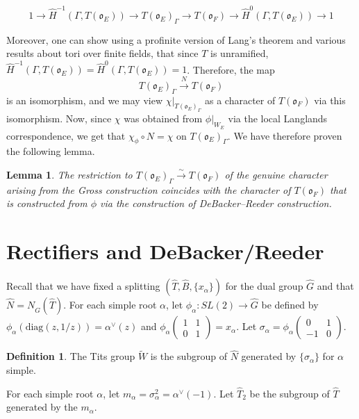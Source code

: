 \documentclass[11pt]{amsart}
\theoremstyle{plain}
\newtheorem{lemma}[theorem]{Lemma}
\theoremstyle{definition}
\newtheorem{definition}[theorem]{Definition}
\newcommand{\mat}[4]{\left( \begin{array}{cc} {#1} & {#2} \\ {#3} & {#4}
\end{array} \right)}
\begin{document}
$$1 \rightarrow \hat{H}^{-1}(\Gamma, T(\mathfrak{o}_E)) \rightarrow T(\mathfrak{o}_E)_{\Gamma}
  \rightarrow T(\mathfrak{o}_F) \rightarrow \hat{H}^0(\Gamma, T(\mathfrak{o}_E)) \rightarrow 1$$

Moreover, one can show using a profinite version of Lang's theorem and
various results about tori over finite fields, that since $T$ is unramified,
$\hat{H}^{-1}(\Gamma, T(\mathfrak{o}_E)) = \hat{H}^0(\Gamma, T(\mathfrak{o}_E)) = 1$.
Therefore, the map
$$T(\mathfrak{o}_E)_{\Gamma} \xrightarrow{N} T(\mathfrak{o}_F)$$
is an isomorphism, and we may view
$\chi|_{T(\mathfrak{o}_E)_{\Gamma}}$ as a character of
$T(\mathfrak{o}_F)$ via this isomorphism.  Now, since $\chi$ was
obtained from $\phi|_{W_E}$ via the local Langlands correspondence, we
get that $\chi_{\phi} \circ N = \chi$ on $T(\mathfrak{o}_E)_{\Gamma}$.
We have therefore proven the following lemma.

\begin{lemma}\label{grossanddebackerreedercompatibility}
  The restriction to $T(\mathfrak{o}_E)_{\Gamma} \xrightarrow{\sim} T(\mathfrak{o}_F)$
  of the genuine character arising from the Gross construction
  coincides with the character of $T(\mathfrak{o}_F)$ that is
  constructed from $\phi$ via the construction of DeBacker--Reeder
  construction.
\end{lemma}

\section{Rectifiers and DeBacker/Reeder}\label{mainresults}

Recall that we have fixed a splitting $(\hat{T}, \hat{B}, \{x_{\alpha} \})$
for the dual group $\hat{G}$ and that $\hat{N} = N_{\hat{G}}(\hat{T})$.
For each simple root $\alpha$, let $\phi_{\alpha} : SL(2) \rightarrow \hat{G}$
be defined by $\phi_{\alpha}(\mathrm{diag}(z,1/z)) = \alpha^{\vee}(z)$
and $\phi_{\alpha}\mat{1}{1}{0}{1} = x_{\alpha}$. Let
$\sigma_{\alpha} = \phi_{\alpha}\mat{0}{1}{-1}{0}$.

\begin{definition}
  The Tits group $\widetilde{W}$ is the subgroup of $\hat{N}$
  generated by $\{\sigma_{\alpha} \}$ for $\alpha$ simple.
\end{definition}

For each simple root $\alpha$, let $m_{\alpha} = \sigma_{\alpha}^2 = \alpha^{\vee}(-1)$.
Let $\hat{T}_2$ be the subgroup of $\hat{T}$ generated by the $m_{\alpha}$.
\end{document}
